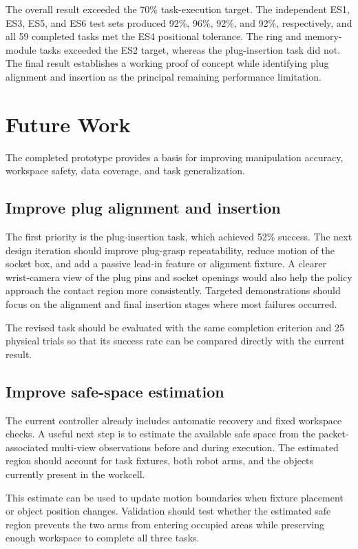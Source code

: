 The overall result exceeded the 70\% task-execution target. The independent ES1, ES3, ES5, and ES6 test sets produced 92\%, 96\%, 92\%, and 92\%, respectively, and all 59 completed tasks met the ES4 positional tolerance. The ring and memory-module tasks exceeded the ES2 target, whereas the plug-insertion task did not. The final result establishes a working proof of concept while identifying plug alignment and insertion as the principal remaining performance limitation.

\chapter{Future Work}\label{chap:future-work}

The completed prototype provides a basis for improving manipulation accuracy,
workspace safety, data coverage, and task generalization.

\section{Improve plug alignment and insertion}

The first priority is the plug-insertion task, which achieved 52\% success.
The next design iteration should improve plug-grasp repeatability, reduce motion
of the socket box, and add a passive lead-in feature or alignment fixture. A
clearer wrist-camera view of the plug pins and socket openings would also help
the policy approach the contact region more consistently. Targeted
demonstrations should focus on the alignment and final insertion stages where
most failures occurred.

The revised task should be evaluated with the same completion criterion and 25
physical trials so that its success rate can be compared directly with the
current result.

\section{Improve safe-space estimation}

The current controller already includes automatic recovery and fixed workspace
checks. A useful next step is to estimate the available safe space from the
packet-associated multi-view observations before and during execution. The
estimated region should account for task fixtures, both robot arms, and the
objects currently present in the workcell.

This estimate can be used to update motion boundaries when fixture placement or
object position changes. Validation should test whether the estimated safe
region prevents the two arms from entering occupied areas while preserving
enough workspace to complete all three tasks.

